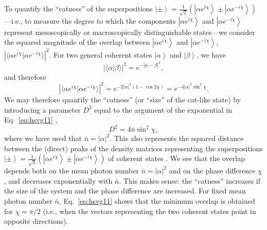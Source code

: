 \documentclass[3p,sort&compress,12pt]{elsarticle}
\newcommand{\ket}[1]{\left\vert{#1}\right\rangle}
\newcommand{\braket}[2]{\ensuremath{{\langle #1}|{#2 \rangle}}}
\providecommand{\abs}[1]{\left\lvert#1\right\rvert}
\newcommand{\E}{\ensuremath{e}}
\newcommand{\I}{\ensuremath{i}}
\begin{document}
To quantify the ``catness'' of the superpositions $\ket{\pm} =\frac{1}{\sqrt{2}} \left(\ket{\alpha \E^{\I \chi}}\pm \ket{\alpha \E^{-\I \chi}} \right)$---i.e., to measure the degree to which the components $\ket{\alpha \E^{\I \chi}}$ and $\ket{\alpha \E^{-\I \chi}}$ represent mesoscopically or macroscopically distinguishable states---we consider the squared magnitude of the overlap between $\ket{\alpha \E^{\I \chi}}$ and $\ket{\alpha \E^{-\I \chi}}$, $\abs{\braket{\alpha \E^{\I \chi}}{\alpha \E^{-\I \chi}}}^2$. For two general coherent states $\ket{\alpha}$ and $\ket{\beta}$, we have
%
\begin{equation}\label{eq:hsvg}
\abs{\braket{\alpha}{\beta}}^2 = \E^{- \abs{\alpha-\beta}^2},
\end{equation}
%
and therefore
%
\begin{equation}\label{eq:hsvg11}
\abs{\braket{\alpha \E^{\I \chi}}{\alpha \E^{-\I \chi}}}^2 = \E^{- 2\abs{\alpha}^2(1-\cos2\chi)} =  \E^{- 4\abs{\alpha}^2\sin^2\chi}.
\end{equation}
%
We may therefore quantify the ``catness'' (or ``size'' of the cat-like state) by introducing a parameter $D^2$ equal to the argument of the exponential in Eq.~\eqref{eq:hsvg11} \cite{Brune:1996:om},
%
\begin{equation}\label{eq:hsADvg11}
D^2 = 4 \bar{n}\sin^2\chi,
\end{equation}
%
where we have used that $\bar{n}=\abs{\alpha}^2$. This also represents the squared distance between the (direct) peaks of the density matrices representing the superpositions $\ket{\pm} =\frac{1}{\sqrt{2}} \left(\ket{\alpha \E^{\I \chi}}\pm \ket{\alpha \E^{-\I \chi}} \right)$ of coherent states \cite{Deleglise:2008:oo}. We see that the overlap depends both on the mean photon number $\bar{n}=\abs{\alpha}^2$ and on the phase difference $\chi$, and decreases exponentially with $\bar{n}$. This makes sense: the ``catness'' increases if the size of the system and the phase difference are increased. For fixed mean photon number $\bar{n}$, Eq.~\eqref{eq:hsvg11} shows that the minimum overlap is obtained for $\chi=\pi/2$ (i.e., when the vectors representing the two coherent states point in opposite directions). 
\end{document}
